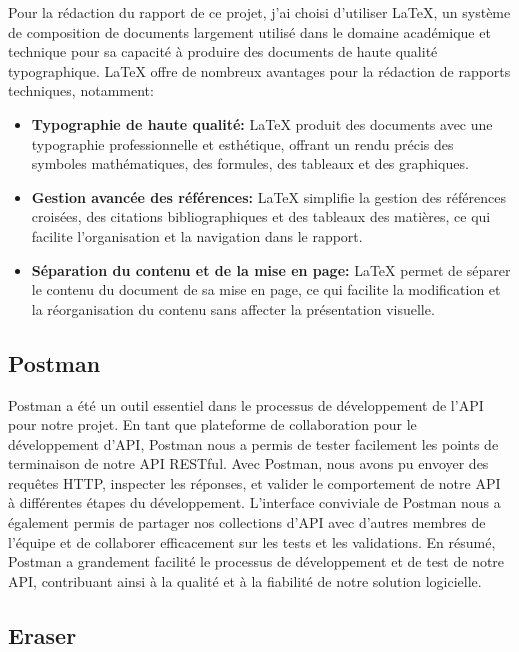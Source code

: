 \hspace{16pt}Pour la rédaction du rapport de ce projet, j'ai choisi d'utiliser \LaTeX, un système de composition de documents largement utilisé dans le domaine académique et technique pour sa capacité à produire des documents de haute qualité typographique. \LaTeX\xspace offre de nombreux avantages pour la rédaction de rapports techniques, notamment:

\begin{itemize}
  \item \textbf{Typographie de haute qualité: }\LaTeX\xspace produit des documents avec une typographie professionnelle et esthétique, offrant un rendu précis des symboles mathématiques, des formules, des tableaux et des graphiques.
  \item \textbf{Gestion avancée des références: }\LaTeX\xspace simplifie la gestion des références croisées, des citations bibliographiques et des tableaux des matières, ce qui facilite l'organisation et la navigation dans le rapport.
  \item \textbf{Séparation du contenu et de la mise en page: }\LaTeX\xspace permet de séparer le contenu du document de sa mise en page, ce qui facilite la modification et la réorganisation du contenu sans affecter la présentation visuelle.
\end{itemize}


\subsection{Postman}

\hspace{16pt}Postman a été un outil essentiel dans le processus de développement de l'API pour notre projet. En tant que plateforme de collaboration pour le développement d'API, Postman nous a permis de tester facilement les points de terminaison de notre API RESTful. Avec Postman, nous avons pu envoyer des requêtes HTTP, inspecter les réponses, et valider le comportement de notre API à différentes étapes du développement. L'interface conviviale de Postman nous a également permis de partager nos collections d'API avec d'autres membres de l'équipe et de collaborer efficacement sur les tests et les validations. En résumé, Postman a grandement facilité le processus de développement et de test de notre API, contribuant ainsi à la qualité et à la fiabilité de notre solution logicielle.


\subsection{Eraser}

